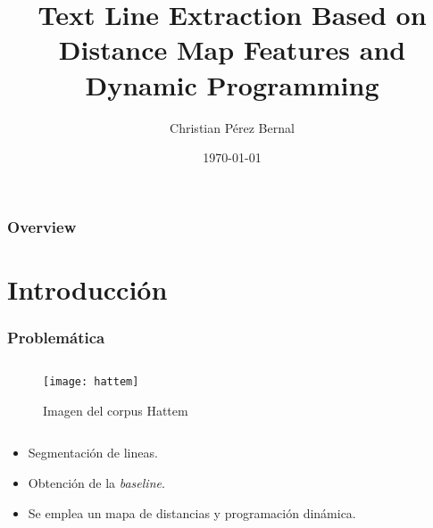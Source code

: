 \documentclass[spanish]{beamer}
\title{Text Line Extraction Based on Distance Map Features and Dynamic Programming} %
\author{Christian Pérez Bernal} %
\institute[UPV] %
{
Universidad Politécnica de Valencia \\ %
\medskip
\textit{cripeber@upv.es} %
}
\date{\today} %
\begin{document}
\begin{frame}
\titlepage %
\end{frame}

\begin{frame}
\frametitle{Overview} %
\tableofcontents %
\end{frame}


\section{Introducción}

\begin{frame}
\frametitle{Problemática}

\begin{column}{0.5\textwidth}
    \begin{figure}[H]
        \centering
        \texttt{[image: hattem]}
        \caption{Imagen del corpus Hattem}
    \end{figure}
\end{column}
\begin{column}{0.5\textwidth}
	\begin{itemize}
    	\item[] Segmentación de lineas.
                \vspace{5}
    	\item[] Obtención de la \textit{baseline}.
    	        \vspace{5}
    	\item[] Se emplea un mapa de distancias y programación dinámica.
    	        \vspace{5}

    \end{itemize}
\end{column}

\end{frame}
\end{document}
